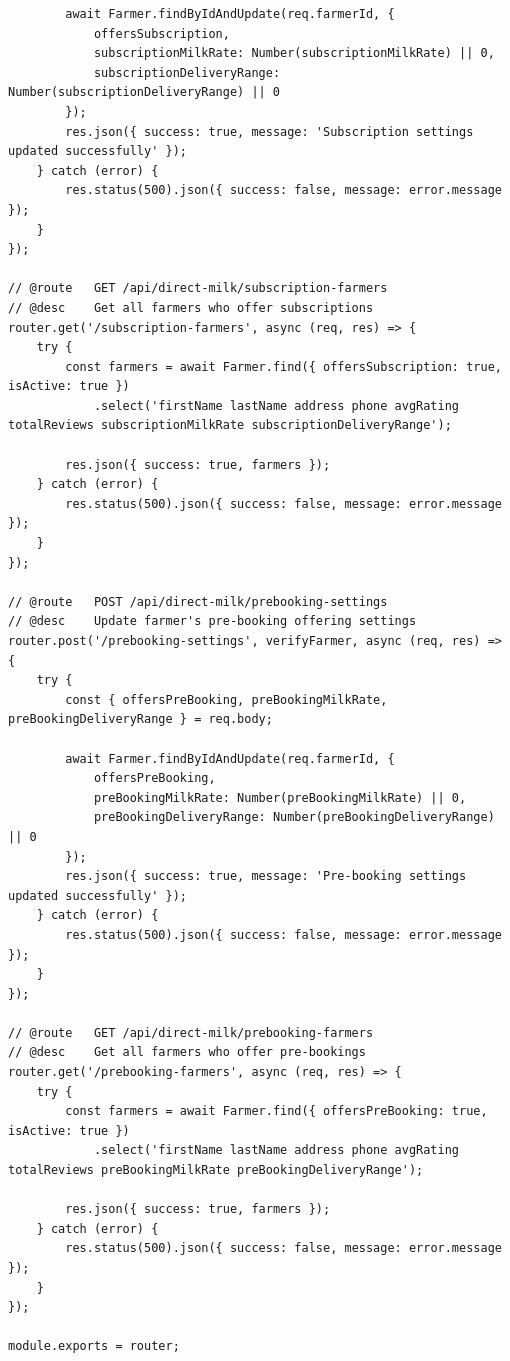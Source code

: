 \documentclass[12pt,a4paper]{report}
\begin{document}
\begin{lstlisting}
        await Farmer.findByIdAndUpdate(req.farmerId, { 
            offersSubscription, 
            subscriptionMilkRate: Number(subscriptionMilkRate) || 0, 
            subscriptionDeliveryRange: Number(subscriptionDeliveryRange) || 0 
        });
        res.json({ success: true, message: 'Subscription settings updated successfully' });
    } catch (error) {
        res.status(500).json({ success: false, message: error.message });
    }
});

// @route   GET /api/direct-milk/subscription-farmers
// @desc    Get all farmers who offer subscriptions
router.get('/subscription-farmers', async (req, res) => {
    try {
        const farmers = await Farmer.find({ offersSubscription: true, isActive: true })
            .select('firstName lastName address phone avgRating totalReviews subscriptionMilkRate subscriptionDeliveryRange');
            
        res.json({ success: true, farmers });
    } catch (error) {
        res.status(500).json({ success: false, message: error.message });
    }
});

// @route   POST /api/direct-milk/prebooking-settings
// @desc    Update farmer's pre-booking offering settings
router.post('/prebooking-settings', verifyFarmer, async (req, res) => {
    try {
        const { offersPreBooking, preBookingMilkRate, preBookingDeliveryRange } = req.body;
        
        await Farmer.findByIdAndUpdate(req.farmerId, { 
            offersPreBooking, 
            preBookingMilkRate: Number(preBookingMilkRate) || 0, 
            preBookingDeliveryRange: Number(preBookingDeliveryRange) || 0 
        });
        res.json({ success: true, message: 'Pre-booking settings updated successfully' });
    } catch (error) {
        res.status(500).json({ success: false, message: error.message });
    }
});

// @route   GET /api/direct-milk/prebooking-farmers
// @desc    Get all farmers who offer pre-bookings
router.get('/prebooking-farmers', async (req, res) => {
    try {
        const farmers = await Farmer.find({ offersPreBooking: true, isActive: true })
            .select('firstName lastName address phone avgRating totalReviews preBookingMilkRate preBookingDeliveryRange');
            
        res.json({ success: true, farmers });
    } catch (error) {
        res.status(500).json({ success: false, message: error.message });
    }
});

module.exports = router;

\end{lstlisting}
\end{document}
